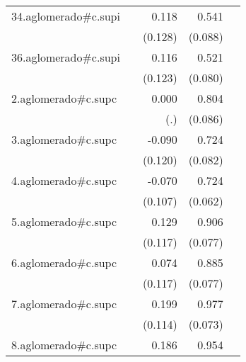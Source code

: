 {\begin{longtable}{l*{4}{D{.}{.}{-1}}}
\addlinespace
34.aglomerado#c.supi&                     &       0.118         &       0.541\sym{***}&                     \\
            &                     &     (0.128)         &     (0.088)         &                     \\
\addlinespace
36.aglomerado#c.supi&                     &       0.116         &       0.521\sym{***}&                     \\
            &                     &     (0.123)         &     (0.080)         &                     \\
\addlinespace
2.aglomerado#c.supc&                     &       0.000         &       0.804\sym{***}&                     \\
            &                     &         (.)         &     (0.086)         &                     \\
\addlinespace
3.aglomerado#c.supc&                     &      -0.090         &       0.724\sym{***}&                     \\
            &                     &     (0.120)         &     (0.082)         &                     \\
\addlinespace
4.aglomerado#c.supc&                     &      -0.070         &       0.724\sym{***}&                     \\
            &                     &     (0.107)         &     (0.062)         &                     \\
\addlinespace
5.aglomerado#c.supc&                     &       0.129         &       0.906\sym{***}&                     \\
            &                     &     (0.117)         &     (0.077)         &                     \\
\addlinespace
6.aglomerado#c.supc&                     &       0.074         &       0.885\sym{***}&                     \\
            &                     &     (0.117)         &     (0.077)         &                     \\
\addlinespace
7.aglomerado#c.supc&                     &       0.199         &       0.977\sym{***}&                     \\
            &                     &     (0.114)         &     (0.073)         &                     \\
\addlinespace
8.aglomerado#c.supc&                     &       0.186         &       0.954\sym{***}&                     \\

\end{longtable}}
